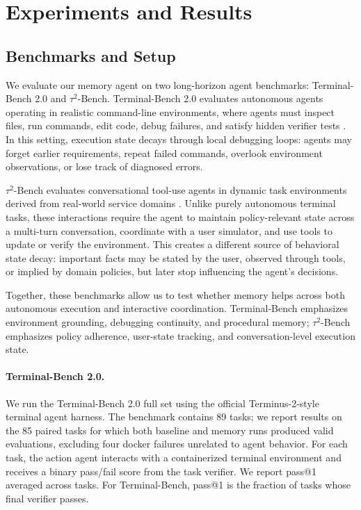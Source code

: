 \section{Experiments and Results}

\subsection{Benchmarks and Setup}

We evaluate our memory agent on two long-horizon agent benchmarks:
Terminal-Bench 2.0 and $\tau^2$-Bench. Terminal-Bench 2.0 evaluates autonomous agents
operating in realistic command-line environments, where agents must inspect
files, run commands, edit code, debug failures, and satisfy hidden verifier tests
\citep{merrill2026terminalbench}. In this setting, execution state decays through
local debugging loops: agents may forget earlier requirements, repeat failed
commands, overlook environment observations, or lose track of diagnosed errors.

$\tau^2$-Bench evaluates conversational tool-use agents in dynamic task
environments derived from real-world service domains \citep{yao2024taubench,
barres2025tau2bench}. Unlike purely autonomous terminal tasks, these interactions
require the agent to maintain policy-relevant state across a multi-turn
conversation, coordinate with a user simulator, and use tools to update or verify
the environment. This creates a different source of behavioral state decay:
important facts may be stated by the user, observed through tools, or implied by
domain policies, but later stop influencing the agent's decisions.

Together, these benchmarks allow us to test whether memory  helps
across both autonomous execution and interactive coordination. Terminal-Bench
emphasizes environment grounding, debugging continuity, and procedural memory;
$\tau^2$-Bench emphasizes policy adherence, user-state tracking, and
conversation-level execution state.

\paragraph{Terminal-Bench 2.0.}
We run the Terminal-Bench 2.0 full set using the official Terminus-2-style
terminal agent harness. The benchmark contains 89 tasks; we report results on
the 85 paired tasks for which both baseline and memory runs produced valid
evaluations, excluding four docker failures unrelated to agent behavior.
For each task, the action agent interacts with a containerized terminal
environment and receives a binary pass/fail score from the task verifier. We
report pass@1 averaged across tasks. For Terminal-Bench, pass@1 is the fraction of tasks whose final verifier
passes.

